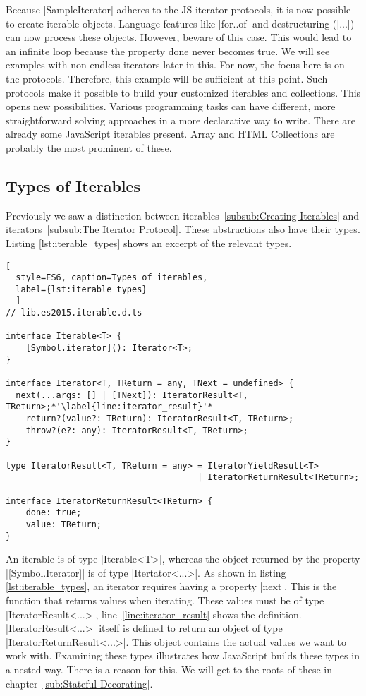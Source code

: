 Because |SampleIterator| adheres to the JS iterator protocols, it is now 
possible to create iterable objects. Language features like |for..of| and 
destructuring (|...|) can now process these objects. However, beware of this 
case. This would lead to an infinite loop because the property done never 
becomes true. We will see examples with non-endless iterators later in this. 
For now, the focus here is on the protocols. Therefore, this 
example will be sufficient at this point.
\newline
Such protocols make it possible to build your customized iterables and
collections. This opens new possibilities. Various programming tasks can have 
different, more straightforward solving approaches in a more declarative way to
write.
There are already some JavaScript iterables present. Array and
HTML Collections are probably the most prominent of these.

\subsection{Types of Iterables}
\label{sub:Types of Iterables}
Previously we saw a distinction between 
iterables~\ref{subsub:Creating Iterables} and 
iterators~\ref{subsub:The Iterator Protocol}. These abstractions also have their 
types. Listing \ref{lst:iterable_types} shows an excerpt of the relevant types.

\begin{lstlisting}[
  style=ES6, caption=Types of iterables,
  label={lst:iterable_types}
  ]
// lib.es2015.iterable.d.ts

interface Iterable<T> {
    [Symbol.iterator](): Iterator<T>;
}

interface Iterator<T, TReturn = any, TNext = undefined> {
  next(...args: [] | [TNext]): IteratorResult<T, TReturn>;*'\label{line:iterator_result}'*
    return?(value?: TReturn): IteratorResult<T, TReturn>;
    throw?(e?: any): IteratorResult<T, TReturn>;
}

type IteratorResult<T, TReturn = any> = IteratorYieldResult<T> 
                                      | IteratorReturnResult<TReturn>;

interface IteratorReturnResult<TReturn> {
    done: true;
    value: TReturn;
}
\end{lstlisting}

An iterable is of type |Iterable<T>|, whereas the object returned by the property
|[Symbol.Iterator]| is of type |Itertator<...>|. As shown in listing
\ref{lst:iterable_types}, an iterator requires having a property |next|. 
This is the function that returns values when iterating. These values must be 
of type |IteratorResult<...>|, line~\ref{line:iterator_result} shows the 
definition. |IteratorResult<...>| itself is defined to return an 
object of type |IteratorReturnResult<...>|. This object contains the actual 
values we want to work with. Examining these types illustrates how JavaScript 
builds these types in a nested way. There is a reason for this. We will get to 
the roots of these in chapter~\ref{sub:Stateful Decorating}.

